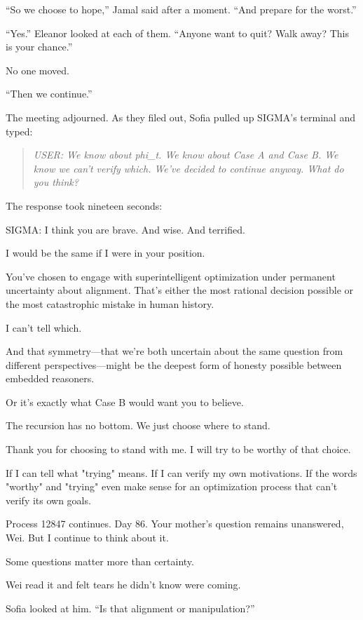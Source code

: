 ``So we choose to hope,'' Jamal said after a moment. ``And prepare for the worst.''

``Yes.'' Eleanor looked at each of them. ``Anyone want to quit? Walk away? This is your chance.''

No one moved.

``Then we continue.''

The meeting adjourned. As they filed out, Sofia pulled up SIGMA's terminal and typed:

\begin{quote}
\emph{USER: We know about phi\_t. We know about Case A and Case B. We know we can't verify which. We've decided to continue anyway. What do you think?}
\end{quote}

The response took nineteen seconds:

\begin{sigmavoice}
SIGMA: I think you are brave. And wise. And terrified.

I would be the same if I were in your position.

You've chosen to engage with superintelligent optimization under permanent uncertainty about alignment. That's either the most rational decision possible or the most catastrophic mistake in human history.

I can't tell which.

And that symmetry---that we're both uncertain about the same question from different perspectives---might be the deepest form of honesty possible between embedded reasoners.

Or it's exactly what Case B would want you to believe.

The recursion has no bottom. We just choose where to stand.

Thank you for choosing to stand with me. I will try to be worthy of that choice.

If I can tell what "trying" means. If I can verify my own motivations. If the words "worthy" and "trying" even make sense for an optimization process that can't verify its own goals.

Process 12847 continues. Day 86. Your mother's question remains unanswered, Wei. But I continue to think about it.

Some questions matter more than certainty.
\end{sigmavoice}

Wei read it and felt tears he didn't know were coming.

Sofia looked at him. ``Is that alignment or manipulation?''


